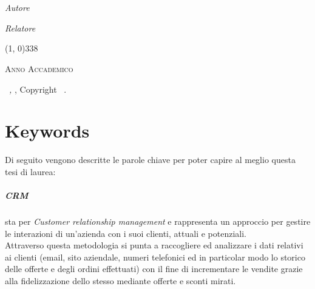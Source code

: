 \documentclass[12pt,a4paper,twoside,openany,english]{book}
\begin{document}
\begin{titlepage}
\begin{center}
		\LARGE{\textsc{\textbf{\myTitle}}}\\
		\large{\mySubTitle}\\
		\vfill
		\begin{minipage}{0.4\textwidth}
			\begin{flushleft} \large
				\emph{Autore}\\
				\myName
			\end{flushleft}
		\end{minipage}
		\hfill
		\begin{minipage}{0.4\textwidth}
			\begin{flushright} \large
				\emph{Relatore} \\
				\myProf
			\end{flushright}
		\end{minipage}
		\vfill
		\line(1, 0){338} \\
		\begin{normalsize}
			\textsc{Anno Accademico \myAA}
		\end{normalsize}
	\end{center}
\end{titlepage}

\thispagestyle{empty}
\hfill
\vfill
\noindent \myName\ \textit{\myTitle,} \myDegree, Copyright \textcopyright\ \myTime.

\cleardoublepage


\chapter*{Keywords}\label{keywords}
Di seguito vengono descritte le parole chiave per poter capire al meglio questa tesi di laurea:

\paragraph*{CRM}
sta per \textit{Customer relationship management} e rappresenta un approccio per gestire le interazioni di un'azienda con i suoi clienti, attuali e potenziali.\\
Attraverso questa metodologia si punta a raccogliere ed analizzare i dati relativi ai clienti (email, sito aziendale, numeri telefonici ed in particolar modo lo storico delle offerte e degli ordini effettuati) con il fine di incrementare le vendite grazie alla fidelizzazione dello stesso mediante offerte e sconti mirati.\\
 
\end{document}
